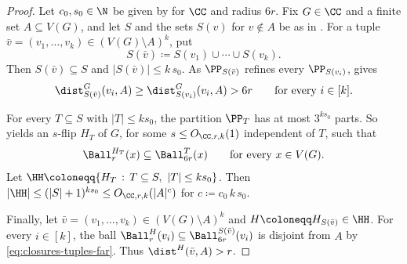 \begin{proof}
    Let $c_0,s_0\in\N$ be given by  for $\CC$ and radius $6r$.
    Fix $G\in\CC$ and a finite set $A\subseteq V(G)$, and let $S$ and the sets $S(v)$ for $v\notin A$ be as in .
    For a tuple $\bar v=(v_1,\ldots,v_k)\in(V(G)\setminus A)^k$, put
    \[
        S(\bar v)\coloneqq S(v_1)\cup\cdots\cup S(v_k).
    \]
    Then $S(\bar v)\subseteq S$ and $|S(\bar v)|\leq k\,s_0$.
    As $\PP_{S(\bar v)}$ refines every $\PP_{S(v_i)}$,  gives
    \begin{equation}\label{eq:closures-tuples-far}
        \dist_{S(\bar v)}^G(v_i,A)\geq\dist_{S(v_i)}^G(v_i,A)>6r
        \qquad\text{for every }i\in[k].
    \end{equation}

    For every $T\subseteq S$ with $|T|\leq ks_0$, the partition $\PP_T$ has at most $3^{ks_0}$ parts.
    So  yields an $s$-flip $H_T$ of $G$, for some $s\leq O_{\CC,r,k}(1)$ independent of $T$, such that
    \[
        \Ball^{H_T}_r(x)\subseteq\Ball^{T}_{6r}(x)
        \qquad\text{for every }x\in V(G).
    \]
    Let $\HH\coloneqq\{H_T \,:\, T\subseteq S,\ |T|\leq ks_0\}$.
    Then $|\HH|\leq(|S|+1)^{ks_0}\leq O_{\CC,r,k}(|A|^{c})$ for $c\coloneqq c_0\, k\, s_0$.

    Finally, let $\bar v=(v_1,\ldots,v_k)\in(V(G)\setminus A)^k$ and $H\coloneqq H_{S(\bar v)}\in\HH$.
    For every $i\in[k]$, the ball $\Ball^H_r(v_i)\subseteq\Ball^{S(\bar v)}_{6r}(v_i)$ is disjoint from $A$ by \eqref{eq:closures-tuples-far}.
    Thus $\dist^H(\bar v,A)>r$.
\end{proof}
